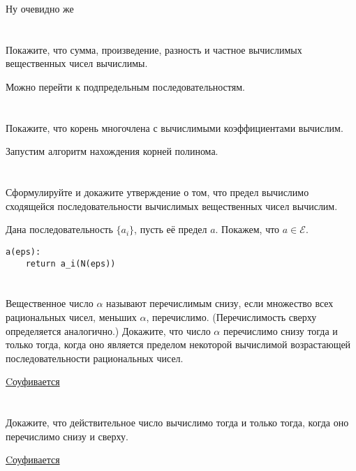 Ну очевидно же

\section{}
Покажите, что сумма, произведение, разность и частное вычислимых вещественных чисел вычислимы.

Можно перейти к подпредельным последовательностям.

\section{}
Покажите, что корень многочлена с вычислимыми коэффициентами вычислим.

Запустим алгоритм нахождения корней полинома.

\section{}
Сформулируйте и докажите утверждение о том, что предел вычислимо сходящейся последовательности вычислимых вещественных чисел вычислим.

Дана последовательность \(\{a_i\}\), пусть её предел \(a\). Покажем, что \(a \in \mathcal{E}\).
\begin{verbatim}
a(eps):
    return a_i(N(eps))
\end{verbatim}

\section{}
Вещественное число $\alpha$ называют перечислимым снизу, если множество всех рациональных чисел, меньших $\alpha$, перечислимо. (Перечислимость сверху определяется аналогично.) Докажите, что число $\alpha$ перечислимо снизу тогда и только тогда, когда оно является пределом некоторой вычислимой возрастающей последовательности рациональных чисел.

\href{https://neerc.ifmo.ru/wiki/index.php?title=%D0%92%D1%8B%D1%87%D0%B8%D1%81%D0%BB%D0%B8%D0%BC%D1%8B%D0%B5_%D1%87%D0%B8%D1%81%D0%BB%D0%B0}{Cоуфивается} 

\section{}
Докажите, что действительное число вычислимо тогда и только тогда, когда оно перечислимо снизу и сверху.

\href{https://neerc.ifmo.ru/wiki/index.php?title=%D0%92%D1%8B%D1%87%D0%B8%D1%81%D0%BB%D0%B8%D0%BC%D1%8B%D0%B5_%D1%87%D0%B8%D1%81%D0%BB%D0%B0}{Cоуфивается} 

